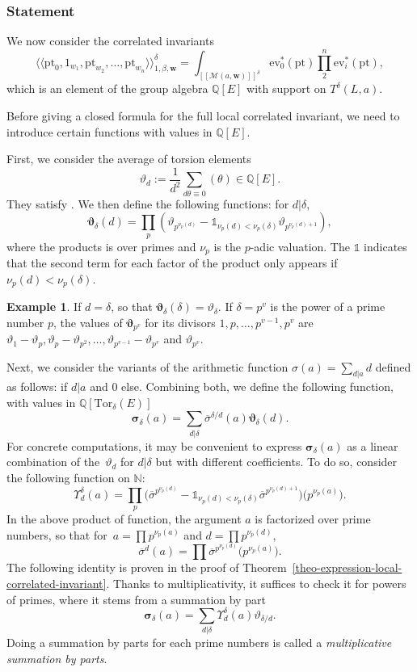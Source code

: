 \documentclass[pdftex]{sigma}
\newcommand{\Tor}{\mathrm{Tor}}
\newcommand{\ev}{\mathrm{ev}}
\newcommand{\pt}{\mathrm{pt}}
\newcommand{\NN}{\mathbb{N}}
\newcommand{\QQ}{\mathbb{Q}}
\newcommand{\bfw}{ {\boldsymbol w} }
\newcommand{\M}{\mathcal{M}}
\numberwithin{equation}{section}
\theoremstyle{definition}
\newtheorem{expl}[theo]{Example}
\begin{document}
\subsubsection{Statement} We now consider the correlated invariants
\[ \langle\langle \pt_0,1_{w_1},\pt_{w_2},\dots,\pt_{w_n}\rangle\rangle^\delta_{1,\beta,\bfw}
= \int_{[\![\M(a,\bfw)]\!]^\delta}\ev_0^*(\pt)\prod_2^n\ev_i^*(\pt), \]
which is an element of the group algebra $\QQ[E]$ with support on $T^\delta(L,a)$.



Before giving a closed formula for the full local correlated invariant, we need to introduce certain functions with values in $\QQ[E]$.

First, we consider the average of torsion elements
\[\vartheta_d:=\frac{1}{d^2}\sum_{d\theta\equiv 0}(\theta) \in\QQ[E].\]
They satisfy .
We then define the following functions: for $d|\delta$,
\[
 \boldsymbol{\vartheta}_\delta(d) = \prod_p (\vartheta_{p^{\nu_p(d)}}-\mathds{1}_{\nu_p(d)<\nu_p(\delta)}\vartheta_{p^{\nu_p(d)+1}} ),
 \]
where the products is over primes and $\nu_p$ is the $p$-adic valuation. The $\mathds{1}$ indicates that the second term for each factor of the product only appears if $\nu_p(d)<\nu_p(\delta)$.

\begin{expl}
 If $d=\delta$, so that $\boldsymbol{\vartheta}_\delta(\delta) =\vartheta_\delta$. If $\delta=p^v$ is the power of a prime number $p$, the values of $\boldsymbol{\vartheta}_{p^v}$ for its divisors $1,p,\dots,p^{v-1},p^v$ are
 $\vartheta_1-\vartheta_p,\vartheta_p-\vartheta_{p^2},\dots, \vartheta_{p^{v-1}}-\vartheta_{p^v}$ and $\vartheta_{p^v}$.
\end{expl}

Next, we consider the variants of the arithmetic function $\sigma(a)=\sum_{d| a}d$ defined as follows:  if $d|a$ and $0$ else. Combining both, we define the following function, with values in $\QQ[\Tor_\delta(E)]$
\[ \boldsymbol{\sigma}_\delta(a)=\sum_{d|\delta}\overline{\sigma}^{\delta/d}(a)\boldsymbol{\vartheta}_\delta(d). \]
For concrete computations, it may be convenient to express $\boldsymbol{\sigma}_\delta(a)$ as a linear combination of the~$\vartheta_d$ for $d|\delta$ but with different coefficients. To do so, consider the following function on $\NN$:
\[
\Upsilon^\delta_d(a) = \prod_p \bigl(\overline{\sigma}^{p^{\nu_p(d)}}-\mathds{1}_{\nu_p(d)<\nu_p(\delta)}\overline{\sigma}^{p^{\nu_p(d)+1}} \bigr)\bigl(p^{\nu_p(a)}\bigr).
\]
In the above product of function, the argument $a$ is factorized over prime numbers, so that for~$a=\prod p^{\nu_p(a)}$ and $d=\prod p^{\nu_p(d)}$,
\[ \overline{\sigma}^d(a)=\prod\overline{\sigma}^{p^{\nu_p(d)}}\bigl(p^{\nu_p(a)}\bigr). \]
The following identity is proven in the proof of Theorem~\ref{theo-expression-local-correlated-invariant}. Thanks to multiplicativity, it suffices to check it for powers of primes, where it stems from a summation by part
\[ \boldsymbol{\sigma}_\delta(a)=\sum_{d|\delta}\Upsilon_d^\delta(a)\vartheta_{\delta/d}. \]
Doing a summation by parts for each prime numbers is called a \textit{multiplicative summation by parts}.
\end{document}
